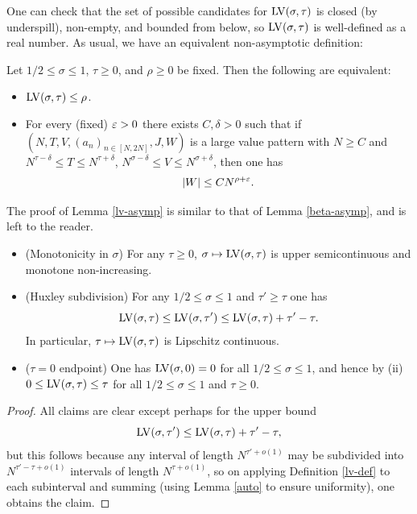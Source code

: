 
One can check that the set of possible candidates for $\mathrm{LV}(\sigma,\tau)$ is closed (by underspill), non-empty, and bounded from below, so $\mathrm{LV}(\sigma,\tau)$ is well-defined as a real number.  As usual, we have an equivalent non-asymptotic definition:

\begin{lemma}\label{lv-asymp} Let $1/2 \leq \sigma \leq 1$, $\tau \geq 0$, and $\rho \geq 0$ be fixed.  Then the following are equivalent:
    \begin{itemize}
    \item[(i)] $\mathrm{LV}(\sigma,\tau) \leq \rho$.
    \item[(ii)] For every (fixed)  $\varepsilon>0$ there exists $C, \delta>0$ such that if $(N,T,V,(a_n)_{n \in [N,2N]},J,W)$ is a large value pattern with $N \geq C$ and $N^{\tau-\delta} \leq T \leq N^{\tau+\delta}$, $N^{\sigma-\delta} \leq V \leq N^{\sigma+\delta}$, then one has
    $$ |W| \leq C N^{\rho+\varepsilon}.$$
    \end{itemize}
\end{lemma}

The proof of Lemma \ref{lv-asymp} is similar to that of Lemma \ref{beta-asymp}, and is left to the reader.


\begin{lemma}\label{lv-basic}
    \begin{itemize}
        \item[(i)] (Monotonicity in $\sigma$) For any $\tau \geq 0$, $\sigma \mapsto \mathrm{LV}(\sigma,\tau)$ is upper semicontinuous and monotone non-increasing.
        \item[(ii)] (Huxley subdivision) For any $1/2 \leq \sigma \leq 1$ and $\tau' \geq \tau$ one has
$$ \mathrm{LV}(\sigma,\tau) \leq \mathrm{LV}(\sigma,\tau') \leq \mathrm{LV}(\sigma,\tau) + \tau'-\tau.$$
In particular, $\tau \mapsto \mathrm{LV}(\sigma,\tau)$ is Lipschitz continuous.
        \item[(iii)]  ($\tau=0$ endpoint) One has $\mathrm{LV}(\sigma,0)=0$ for all $1/2 \leq \sigma \leq 1$, and hence by (ii) $0 \leq \mathrm{LV}(\sigma,\tau) \leq \tau$ for all $1/2 \leq \sigma \leq 1$ and $\tau \geq 0$.
    \end{itemize}
\end{lemma}


\begin{proof}
All claims are clear except perhaps for the upper bound
$$ \mathrm{LV}(\sigma,\tau') \leq \mathrm{LV}(\sigma,\tau) + \tau'-\tau,$$
but this follows because any interval of length $N^{\tau'+o(1)}$ may be subdivided into $N^{\tau'-\tau+o(1)}$ intervals of length $N^{\tau+o(1)}$, so on applying Definition \ref{lv-def} to each subinterval and summing (using Lemma \ref{auto} to ensure uniformity), one obtains the claim.
\end{proof}

